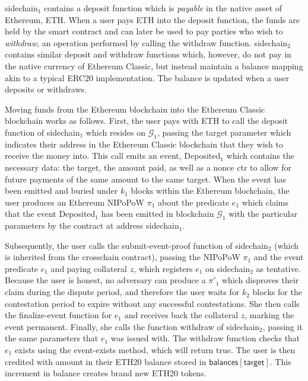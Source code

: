 \textsf{sidechain}$_1$ contains a \textsf{deposit} function
which is \emph{payable} in the native asset of Ethereum, ETH. When a user pays
ETH into the \textsf{deposit} function, the funds are held by the smart contract
and can later be used to pay parties who wish to \emph{withdraw}, an operation
performed by calling the \textsf{withdraw} function. \textsf{sidechain}$_2$
contains similar \textsf{deposit} and \textsf{withdraw} functions which,
however, do not pay in the native currency of Ethereum Classic, but instead
maintain a \textsf{balance} mapping akin to a typical ERC20 implementation. The
balance is updated when a user deposits or withdraws.

Moving funds from the Ethereum blockchain into the Ethereum Classic blockchain
works as follows. First, the user pays with ETH to call the \textsf{deposit}
function of \textsf{sidechain}$_1$ which resides on $\mathcal{G}_1$, passing the
\textsf{target} parameter which indicates their address in the Ethereum Classic
blockchain that they wish to receive the money into. This call emits an event,
\textsf{Deposited}$_1$ which contains the necessary data: the \textsf{target},
the \textsf{amount} paid, as well as a nonce \textsf{ctr} to allow for future
payments of the same amount to the same target. When the event has been emitted
and buried under $k_1$ blocks within the Ethereum blockchain, the user produces
an Ethereum NIPoPoW $\pi_1$ about the predicate $e_1$ which claims that the
event \textsf{Deposited}$_1$ has been emitted in blockchain $\mathcal{G}_1$ with
the particular parameters by the contract at address \textsf{sidechain}$_1$.

Subsequently, the user calls the \textsf{submit-event-proof} function of
\textsf{sidechain}$_2$ (which is inherited from the \textsf{crosschain}
contract), passing the NIPoPoW $\pi_1$ and the event predicate $e_1$ and paying
collateral $z$, which registers $e_1$ on \textsf{sidechain}$_2$ as tentative.
Because the user is honest, no adversary can produce a $\pi'_1$
which disproves their claim during the dispute period, and therefore the user
waits for $k_2$ blocks for the contestation period to expire without any
successful contestations. She then calls the \textsf{finalize-event} function
for $e_1$ and receives back the collateral $z$, marking the event permanent.
Finally, she calls the function \textsf{withdraw} of \textsf{sidechain}$_2$,
passing it the same parameters that $e_1$ was issued with. The \textsf{withdraw}
function checks that $e_1$ exists using the \textsf{event-exists} method, which
will return \textsf{true}. The user is then credited with \textsf{amount} in
their ETH20 balance stored in $\textsf{balances}[\textsf{target}]$. This
increment in balance creates brand new ETH20 tokens.

